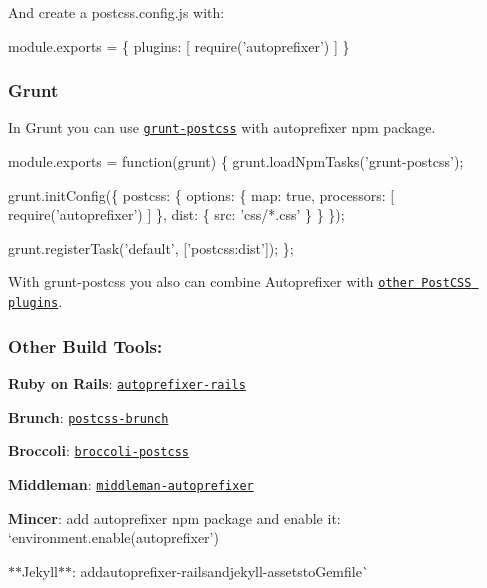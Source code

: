 And create a {\ttfamily postcss.\+config.\+js} with\+:


\begin{DoxyCode}
module.exports = \{
  plugins: [
    require('autoprefixer')
  ]
\}
\end{DoxyCode}


\subsubsection*{Grunt}

In Grunt you can use \href{https://github.com/nDmitry/grunt-postcss}{\tt grunt-\/postcss} with {\ttfamily autoprefixer} npm package.


\begin{DoxyCode}
module.exports = function(grunt) \{
    grunt.loadNpmTasks('grunt-postcss');

    grunt.initConfig(\{
        postcss: \{
            options: \{
                map: true,
                processors: [
                    require('autoprefixer')
                ]
            \},
            dist: \{
                src: 'css/*.css'
            \}
        \}
    \});

    grunt.registerTask('default', ['postcss:dist']);
\};
\end{DoxyCode}


With {\ttfamily grunt-\/postcss} you also can combine Autoprefixer with \href{https://github.com/postcss/postcss#plugins}{\tt other Post\+C\+SS plugins}.

\subsubsection*{Other Build Tools\+:}


\begin{DoxyItemize}
\item {\bfseries Ruby on Rails}\+: \href{https://github.com/ai/autoprefixer-rails}{\tt autoprefixer-\/rails}
\item {\bfseries Brunch}\+: \href{https://github.com/iamvdo/postcss-brunch}{\tt postcss-\/brunch}
\item {\bfseries Broccoli}\+: \href{https://github.com/jeffjewiss/broccoli-postcss}{\tt broccoli-\/postcss}
\item {\bfseries Middleman}\+: \href{https://github.com/middleman/middleman-autoprefixer}{\tt middleman-\/autoprefixer}
\item {\bfseries Mincer}\+: add {\ttfamily autoprefixer} npm package and enable it\+: `environment.\+enable(\textquotesingle{}autoprefixer'){\ttfamily }
\item {\ttfamily $\ast$$\ast$\+Jekyll$\ast$$\ast$\+: add}autoprefixer-\/rails{\ttfamily and}jekyll-\/assets{\ttfamily to}Gemfile\`{}
\end{DoxyItemize}

